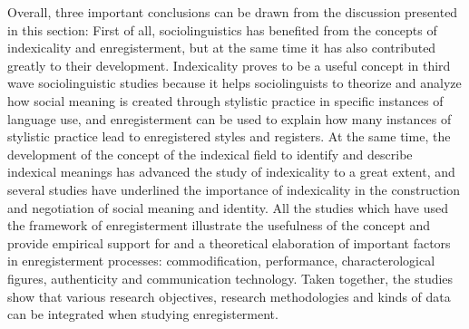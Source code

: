 Overall, three important conclusions can be drawn from the discussion presented in this section: First of all, sociolinguistics has benefited from the concepts of indexicality and enregisterment, but at the same time it has also contributed greatly to their development. Indexicality proves to be a useful concept in third wave sociolinguistic studies because it helps sociolinguists to theorize and analyze how social meaning is created through stylistic practice in specific instances of language use, and enregisterment can be used to explain how many instances of stylistic practice lead to enregistered styles and registers. At the same time, the development of the concept of the indexical field to identify and describe indexical meanings has advanced the study of indexicality to a great extent, and several studies have underlined the importance of indexicality in the construction and negotiation of social meaning and identity. All the studies which have used the framework of enregisterment illustrate the usefulness of the concept and provide empirical support for and a theoretical elaboration of important factors in enregisterment processes: commodification, performance, characterological figures, authenticity and communication technology. Taken together, the studies show that various research objectives, research methodologies and kinds of data can be integrated when studying enregisterment.

